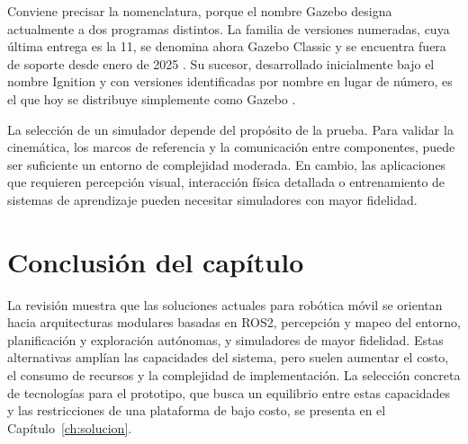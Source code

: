 Conviene precisar la nomenclatura, porque el nombre Gazebo designa
actualmente a dos programas distintos. La familia de versiones numeradas,
cuya última entrega es la 11, se denomina ahora Gazebo Classic y se encuentra
fuera de soporte desde enero de 2025 \citep{osrf2025gazeboclassic}. Su
sucesor, desarrollado inicialmente bajo el nombre Ignition y con versiones
identificadas por nombre en lugar de número, es el que hoy se distribuye
simplemente como Gazebo \citep{openrobotics2025gzmigration}.

La selección de un simulador depende del propósito de la prueba. Para validar
la cinemática, los marcos de referencia y la comunicación entre componentes,
puede ser suficiente un entorno de complejidad moderada. En cambio, las
aplicaciones que requieren percepción visual, interacción física detallada o
entrenamiento de sistemas de aprendizaje pueden necesitar simuladores con
mayor fidelidad.

\section*{Conclusión del capítulo}

La revisión muestra que las soluciones actuales para robótica móvil se
orientan hacia arquitecturas modulares basadas en \gls{ROS2}, percepción y
mapeo del entorno, planificación y exploración autónomas, y simuladores de
mayor fidelidad. Estas alternativas amplían las capacidades del sistema, pero suelen aumentar el costo, el consumo de recursos y la complejidad de
implementación. La selección concreta de tecnologías para el prototipo, que
busca un equilibrio entre estas capacidades y las restricciones de una
plataforma de bajo costo, se presenta en el Capítulo~\ref{ch:solucion}.

